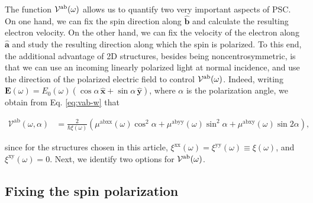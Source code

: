 \documentclass[floatfix,prb,aps,superscriptaddress,showpacs,11pt,preprint,letterpaper]{revtex4}
\begin{document}
The function ${\cal V}^{\mathrm{a}\mathrm{b}}(\omega)$ allows us to quantify
two very important aspects of PSC. On one hand, we can fix the spin direction
along $\hat{\mathbf{b}}$ and calculate the resulting electron velocity. On the other
hand, we can fix the velocity of the electron along $\hat{\mathbf{a}}$
 and study the
resulting direction along which the spin is polarized. To this end, the
additional advantage of  2D structures, besides being noncentrosymmetric, is
that we can use an incoming linearly polarized  light at normal incidence, and
use the  direction of the polarized  electric field to control ${\cal
V}^{\mathrm{a}\mathrm{b}}(\omega)$. Indeed, writing ${\mathbf E}(\omega) =
E_0(\omega)(\cos\alpha\,\hat{\mathbf x}+\sin\alpha\,\hat{\mathbf y})$, where
$\alpha$ is the polarization angle, we obtain from Eq. \eqref{eq:vab-w} that
\begin{widetext}
\begin{align}
\mathcal{V}^{\mathrm{ab}}(\omega,\alpha)
&= 
\frac{2}{\hbar\xi(\omega)}
\left(\mu^{\mathrm{abxx}}(\omega)\cos^{2}\alpha + 
\mu^{\mathrm{abyy}}(\omega)\sin^{2}\alpha + 
\mu^{\mathrm{abxy}}(\omega)\sin 2\alpha\right)
,
\label{eq:vab-aw}
\end{align}
\end{widetext}
since for the structures chosen in this article,
$\xi^{\mathrm{xx}}(\omega)=\xi^{\mathrm{yy}}(\omega)\equiv\xi(\omega)$, and
$\xi^{\mathrm{xy}}(\omega)=0$. Next, we identify two options for ${\cal
V}^{\mathrm{a}\mathrm{b}}(\omega)$.

\subsection{Fixing the spin polarization}\label{sec:theory-fixspin}
\end{document}
